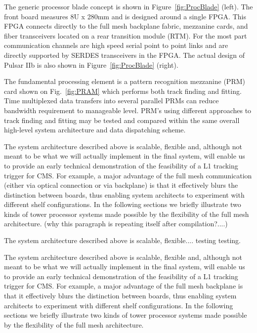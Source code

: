 \noindent The generic processor blade concept is shown in Figure~\ref{fig:ProcBlade} (left).  The front board measures 8U x 280mm and is designed around a single FPGA.  This FPGA connects directly to the full mesh backplane fabric, mezzanine cards, and fiber transceivers located on a rear transition module (RTM).  For the most part communication channels are high speed serial point to point links and are directly supported by SERDES transceivers in the FPGA. The actual design of Pulsar IIb is also shown in Figure~\ref{fig:ProcBlade} (right).

\noindent The fundamental processing element is a pattern recognition mezzanine (PRM) card shown on Fig.~\ref{fig:PRAM} which performs both track finding and fitting. Time multiplexed data transfers into several parallel PRMs can reduce bandwidth requirement to manageable level.  PRM's using different approaches to track finding and fitting may be tested and compared within the same overall high-level system architecture and data dispatching scheme.


The system architecture described above is scalable, flexible and, although not meant to be what we
will actually implement in the final system, will enable us to provide an early technical demonstration
of the feasibility of a L1 tracking trigger for CMS. For example, a major advantage of the full mesh
communication (either via optical connection or via backplane) is that it effectively blurs the distinction between boards, thus enabling system architects to
experiment with different shelf configurations. In the following sections we briefly illustrate two kinds of
tower processor systems made possible by the flexibility of the full mesh architecture. (why this paragraph is repeating itself after compilation?....)


The system architecture described above is scalable, flexible.... testing testing.



\noindent

The system architecture described above is scalable, flexible and, although not meant to be what we will actually implement in the final system, will enable us to provide an early technical demonstration of the feasibility of a L1 tracking trigger for CMS. For example,
a major advantage of the full mesh backplane is that it effectively blurs the distinction between boards, thus enabling system architects to experiment with different shelf configurations.  In the following sections we briefly illustrate two kinds of tower processor systems made possible by the flexibility of the full mesh architecture.

